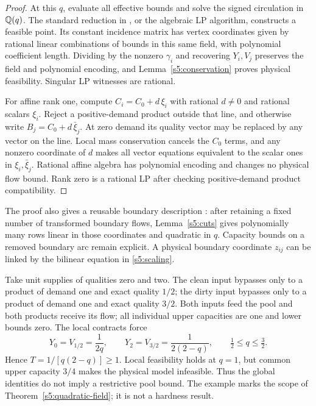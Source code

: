 \begin{proof}
At this $q$, evaluate all effective bounds and solve the signed
circulation in $\mathbb Q(q)$. The standard reduction in
\citet[Corollary~11.3a, p.~176]{s5:schrijver2003}, or the algebraic LP
algorithm, constructs a feasible point. Its constant incidence matrix
has vertex coordinates given by rational linear combinations of bounds
in this same field, with polynomial coefficient length. Dividing by
the nonzero $\gamma_i$ and recovering $Y_i,V_j$ preserves the field
and polynomial encoding, and Lemma~\ref{s5:conservation} proves physical
feasibility. Singular LP witnesses are rational.

For affine rank one, compute $C_i=C_0+d\,\xi_i$ with rational
$d\ne0$ and rational scalars $\xi_i$. Reject a positive-demand product
outside that line, and otherwise write $B_j=C_0+d\,\bar\xi_j$.
At zero demand its quality vector may be replaced by any vector on the
line. Local mass conservation cancels the $C_0$ terms, and any nonzero
coordinate of $d$ makes all vector equations equivalent to the scalar
ones in $\xi_i,\bar\xi_j$. Rational affine algebra has polynomial
encoding and changes no physical flow bound. Rank zero is a rational
LP after checking positive-demand product compatibility.
\end{proof}

The proof also gives a reusable boundary description
\label{s5:fixed-boundary}: after retaining a fixed number of transformed
boundary flows, Lemma~\ref{s5:cuts} gives polynomially many rows linear
in those coordinates and quadratic in $q$. Capacity bounds on a removed
boundary arc remain explicit. A physical boundary coordinate $z_{ij}$
can be linked by the bilinear equation in \eqref{s5:scaling}.

\begin{example}
\label{s5:capacity-counterexample}
Take unit supplies of qualities zero and two. The clean input bypasses
only to a product of demand one and exact quality $1/2$; the dirty input
bypasses only to a product of demand one and exact quality $3/2$.
Both inputs feed the pool and both products receive its flow; all
individual upper capacities are one and lower bounds zero. The local
contracts force
\[
 Y_0=V_{1/2}=\frac1{2q},\qquad
 Y_2=V_{3/2}=\frac1{2(2-q)},\qquad \tfrac12\le q\le\tfrac32.
\]
Hence $T=1/[q(2-q)]\ge1$. Local feasibility holds at $q=1$, but common
upper capacity $3/4$ makes the physical model infeasible. Thus the global
identities do not imply a restrictive pool bound. The example marks
the scope of Theorem~\ref{s5:quadratic-field}; it is not a hardness result.
\end{example}

